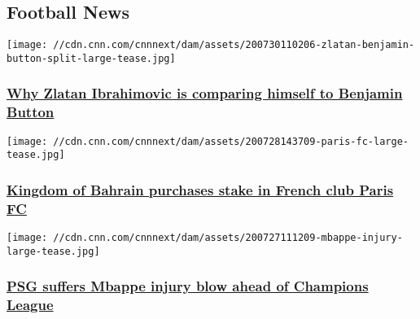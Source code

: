 \hypertarget{football-news-}{%
\subsection{Football News~}\label{football-news-}}

\href{/2020/07/30/football/zlatan-ibrahimovic-benjamin-button-serie-a-spt-intl/index.html}{}

\texttt{[image: //cdn.cnn.com/cnnnext/dam/assets/200730110206-zlatan-benjamin-button-split-large-tease.jpg]}

\hypertarget{why-zlatan-ibrahimovic-is-comparing-himself-to-benjamin-button}{%
\subsubsection{\texorpdfstring{\href{/2020/07/30/football/zlatan-ibrahimovic-benjamin-button-serie-a-spt-intl/index.html}{Why
Zlatan Ibrahimovic is comparing himself to Benjamin
Button}}{Why Zlatan Ibrahimovic is comparing himself to Benjamin Button}}\label{why-zlatan-ibrahimovic-is-comparing-himself-to-benjamin-button}}

\href{/2020/07/28/football/paris-fc-bahrain-investment-football-ligue-2-spt-intl/index.html}{}

\texttt{[image: //cdn.cnn.com/cnnnext/dam/assets/200728143709-paris-fc-large-tease.jpg]}

\hypertarget{kingdom-of-bahrain-purchases-stake-in-french-club-paris-fc}{%
\subsubsection{\texorpdfstring{\href{/2020/07/28/football/paris-fc-bahrain-investment-football-ligue-2-spt-intl/index.html}{Kingdom
of Bahrain purchases stake in French club Paris
FC}}{Kingdom of Bahrain purchases stake in French club Paris FC}}\label{kingdom-of-bahrain-purchases-stake-in-french-club-paris-fc}}

\href{/2020/07/27/football/kylian-mbappe-psg-french-cup-injury-champions-league-spt-intl/index.html}{}

\texttt{[image: //cdn.cnn.com/cnnnext/dam/assets/200727111209-mbappe-injury-large-tease.jpg]}

\hypertarget{psg-suffers-mbappe-injury-blow-ahead-of-champions-league}{%
\subsubsection{\texorpdfstring{\href{/2020/07/27/football/kylian-mbappe-psg-french-cup-injury-champions-league-spt-intl/index.html}{PSG
suffers Mbappe injury blow ahead of Champions
League}}{PSG suffers Mbappe injury blow ahead of Champions League}}\label{psg-suffers-mbappe-injury-blow-ahead-of-champions-league}}

